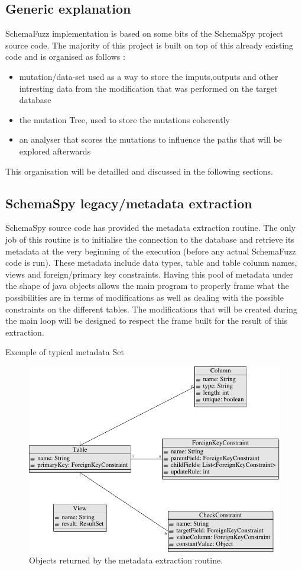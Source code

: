 \documentclass{article}
\begin{document}
\begin{empfile}
		\subsection{Generic explanation}
SchemaFuzz implementation is based on some bits of the SchemaSpy project source code.
The majority of this project is built on top of this already existing code and is organised as follows :
		\begin{itemize}
		\item{mutation/data-set used as a way to store the imputs,outputs and other intresting data from the modification that was performed on the target database}
		\item{the mutation Tree, used to store the mutations coherently}
		\item{an analyser that scores the mutations to influence the paths that will be explored afterwards}
		\end{itemize}
		 
This organisation will be detailled and discussed in the following sections.
		\subsection{SchemaSpy legacy/metadata extraction}
SchemaSpy source code has provided the metadata extraction routine. The only job of this routine is to initialise the connection to the database and retrieve its metadata at the very beginning of the execution (before any actual SchemaFuzz code is run). These metadata include data types, table and table column names, views and foreign/primary key constraints. Having this pool of metadata under the shape of java objects allows the main program to properly frame what the possibilities are in terms of modifications as well as dealing with the possible constraints on the different tables. The modifications that will be created during the main loop will be designed to respect the frame built for the result of this extraction.

Exemple of typical metadata Set 


\begin{figure} [htbp]
\centering
\includegraphics[scale=1]{MetaDataExtractionDiagram-1.pdf}
\caption{Objects returned by the metadata extraction routine.}
\end{figure}


\end{empfile}
\end{document}
